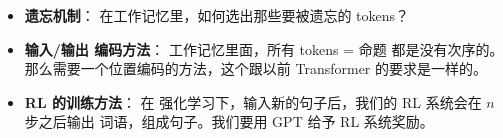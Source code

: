 \begin{preview}
\begin{minipage}{\textwidth}
\begin{itemize}
	\item [\circled{3}] \textbf{遗忘机制}： 在工作记忆里，如何选出那些要被遗忘的 tokens？
	
	\item [\circled{4}] \textbf{输入/输出 编码方法}： 工作记忆里面，所有 tokens = 命题 都是没有次序的。 那么需要一个位置编码的方法，这个跟以前 Transformer 的要求是一样的。
	
	\item [\circled{5}]  \textbf{RL 的训练方法}： 在 强化学习下，输入新的句子后，我们的 RL 系统会在 $n$ 步之后输出 词语，组成句子。我们要用 GPT 给予 RL 系统奖励。
	
\end{itemize}

\end{minipage}
\end{preview}

